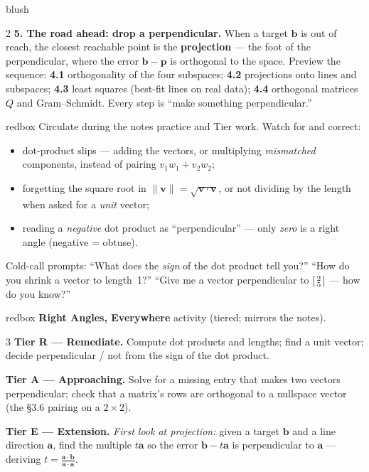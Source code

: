 \documentclass[10pt]{article}
\newcommand{\vv}{\mathbf{v}}
\begin{document}
\begin{skillbox}[Lesson]{blush}
\begin{multicols}{2}
\textbf{5. The road ahead: drop a perpendicular.} When a target $\mathbf b$ is out of reach, the
closest reachable point is the \textbf{projection} --- the foot of the perpendicular, where the
error $\mathbf b-\mathbf p$ is orthogonal to the space. Preview the sequence:
\textbf{4.1} orthogonality of the four subspaces; \textbf{4.2} projections onto lines and
subspaces; \textbf{4.3} least squares (best-fit lines on real data); \textbf{4.4} orthogonal
matrices $Q$ and Gram--Schmidt. Every step is ``make something perpendicular.''
\end{multicols}
\end{skillbox}

\begin{skillbox}{redbox}
Circulate during the notes practice and Tier work. Watch for and correct:
\begin{itemize}[leftmargin=1.2em, nosep]
  \item dot-product slips --- adding the vectors, or multiplying \emph{mismatched} components,
        instead of pairing $v_1w_1+v_2w_2$;
  \item forgetting the square root in $\|\vv\|=\sqrt{\vv\cdot\vv}$, or not dividing by the length
        when asked for a \emph{unit} vector;
  \item reading a \emph{negative} dot product as ``perpendicular'' --- only \emph{zero} is a right
        angle (negative = obtuse).
\end{itemize}
Cold-call prompts: ``What does the \emph{sign} of the dot product tell you?'' ``How do you shrink a
vector to length~1?'' ``Give me a vector perpendicular to $\begin{bsmallmatrix} 2\\5 \end{bsmallmatrix}$
--- how do you know?''
\end{skillbox}

\begin{skillbox}{redbox}
\textbf{Right Angles, Everywhere} activity (tiered; mirrors the notes).
\begin{multicols}{3}
\textbf{Tier R --- Remediate.} Compute dot products and lengths; find a unit vector; decide
perpendicular / not from the sign of the dot product.

\columnbreak
\textbf{Tier A --- Approaching.} Solve for a missing entry that makes two vectors perpendicular;
check that a matrix's rows are orthogonal to a nullspace vector (the §3.6 pairing on a $2\times2$).

\columnbreak
\textbf{Tier E --- Extension.} \emph{First look at projection:} given a target $\mathbf b$ and a
line direction $\mathbf a$, find the multiple $t\mathbf a$ so the error $\mathbf b-t\mathbf a$ is
perpendicular to $\mathbf a$ --- deriving $t=\frac{\mathbf a\cdot\mathbf b}{\mathbf a\cdot\mathbf a}$.
\end{multicols}
\end{skillbox}
\end{document}
